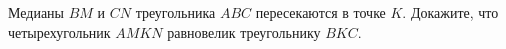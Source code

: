 \begin{ex}
	\begin{condition}
		Медианы \( BM \) и \( CN \) треугольника \( ABC \) пересекаются в точке \( K \). Докажите, что четырехугольник \( AMKN \) равновелик треугольнику \( BKC \).
	\end{condition}
\end{ex}